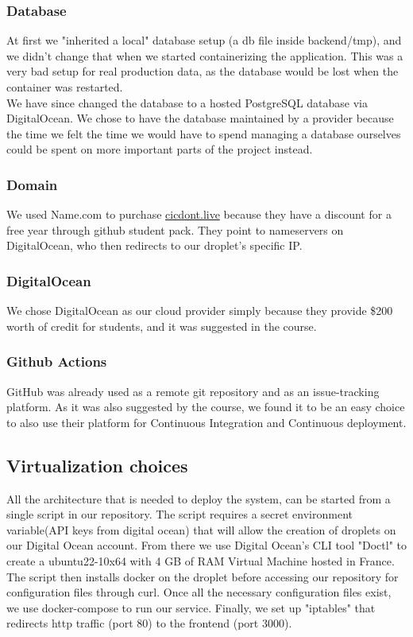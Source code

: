 \subsubsection{Database}
At first we "inherited a local" database setup (a db file inside backend/tmp), and we didn't change that when we started containerizing the application. This was a very bad setup for real production data, as the database would be lost when the container was restarted. \\
We have since changed the database to a hosted PostgreSQL database via DigitalOcean. We chose to have the database maintained by a provider because the time we felt the time we would have to spend managing a database ourselves could be spent on more important parts of the project instead.
\subsubsection{Domain}
We used Name.com to purchase \url{cicdont.live} because they have a discount for a free year through github student pack. They point to nameservers on DigitalOcean, who then redirects to our droplet's specific IP. 

\subsubsection{DigitalOcean}
We chose DigitalOcean as our cloud provider simply because they provide \$200 worth of credit for students, and it was suggested in the course.

\subsubsection{Github Actions}
GitHub was already used as a remote git repository and as an issue-tracking platform. As it was also suggested by the course, we found it to be an easy choice to also use their platform for Continuous Integration and Continuous deployment. 

\subsection{Virtualization choices}
All the architecture that is needed to deploy the system, can be started from a single script in our repository.
The script requires a secret environment variable(API keys from digital ocean) that will allow the creation of droplets on our Digital Ocean account. From there we use Digital Ocean's CLI tool "Doctl" to create a ubuntu22-10x64 with 4 GB of RAM Virtual Machine hosted in France. The script then installs docker on the droplet before accessing our repository for configuration files through curl. Once all the necessary configuration files exist, we use docker-compose to run our service. Finally, we set up "iptables" that redirects http traffic (port 80) to the frontend (port 3000). 